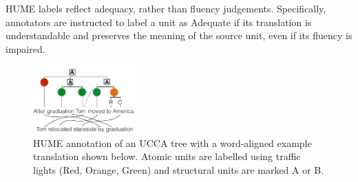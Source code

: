 \documentclass[11pt,letterpaper]{article}
\newcommand{\com}[1]{}
\newcommand{\figref}[1]{Figure~\ref{#1}}
\begin{document}
HUME labels reflect adequacy, rather than fluency judgements.
Specifically, annotators are instructed to
label a unit as Adequate if its translation is understandable and preserves
the meaning of the source unit, even if its fluency is impaired.

\com{
In non-configurational languages, the relationship between the
governing and dependent units is often expressed using morphological
properties of the dependants instead of their ordering
(this holds especially for the verb and its modifiers,
less so for components of noun phrases). Errors in morphology
should be expressed on the atomic units, so HUME can behave differently
on configurational vs. non-configurational languages.
}




\begin{figure}
    \begin{center}
    \includegraphics[width=0.35\textwidth]{ucca-tree-mteval-v3.png}
    \end{center}
  \caption{\label{fig:hume_tree_v2}
     HUME annotation of an UCCA tree with a word-aligned example translation shown below. 
     Atomic units are labelled using traffic lights (Red, Orange, Green) and structural
     units are marked A or B.}
\end{figure}
\end{document}

